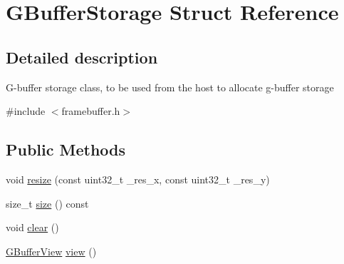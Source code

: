 \hypertarget{struct_g_buffer_storage}{}\section{G\+Buffer\+Storage Struct Reference}
\label{struct_g_buffer_storage}


\subsection{Detailed description}
G-\/buffer storage class, to be used from the host to allocate g-\/buffer storage 

{\ttfamily \#include $<$framebuffer.\+h$>$}

\subsection*{Public Methods}
\begin{DoxyCompactItemize}
\item 
void \hyperlink{struct_g_buffer_storage_a4c56dec448dc48418f8e4dd47adc8e44}{resize} (const uint32\+\_\+t \+\_\+res\+\_\+x, const uint32\+\_\+t \+\_\+res\+\_\+y)
\item 
size\+\_\+t \hyperlink{struct_g_buffer_storage_ad9fd298041c1d4f7b239c0242a8f8b5f}{size} () const
\item 
void \hyperlink{struct_g_buffer_storage_a9d8e6e8f1dc353833e1c18ae4304561e}{clear} ()
\item 
\hyperlink{struct_g_buffer_view}{G\+Buffer\+View} \hyperlink{struct_g_buffer_storage_ade6d37a2dba46fe7b701634fe97fb7b9}{view} ()
\end{DoxyCompactItemize}
